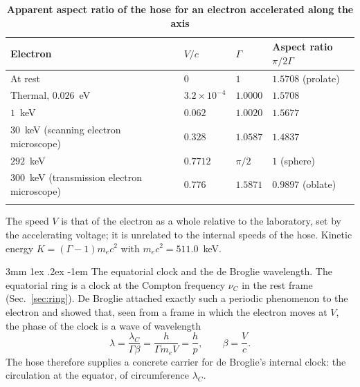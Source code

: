 \documentclass[%
 reprint, amsmath,amssymb, aps, prb, ]{revtex4-2}
\makeatletter
\numberwithin{equation}{section}
\renewcommand\paragraph{%
  \@startsection{paragraph}{4}{\z@}%
    {3mm \@plus 1ex \@minus .2ex}%
    {-1em}%
    {\normalfont\normalsize\itshape}}
\newcommand{\lamC}{\lambda_C}
\makeatother
\begin{document}
\begin{table}[t!]
\centering
\caption{\textbf{Apparent aspect ratio of the hose for an electron accelerated along the axis}}
\label{tab:boost}
\renewcommand{\arraystretch}{1.4}
\begin{tabular}{p{6.6cm}p{2.6cm}p{2.6cm}p{3.7cm}}
\toprule
\textbf{Electron} & \textbf{$V/c$} & \textbf{$\Gamma$} & \textbf{Aspect ratio $\pi/2\Gamma$} \\
\midrule
At rest & $0$ & $1$ & $1.5708$ (prolate) \\
\addlinespace[0.3cm]
Thermal, $0.026$~eV & $3.2\times10^{-4}$ & $1.0000$ & $1.5708$ \\
\addlinespace[0.3cm]
$1$~keV & $0.062$ & $1.0020$ & $1.5677$ \\
\addlinespace[0.3cm]
$30$~keV (scanning electron microscope) & $0.328$ & $1.0587$ & $1.4837$ \\
\addlinespace[0.3cm]
$292$~keV & $0.7712$ & $\pi/2$ & $1$ (sphere) \\
\addlinespace[0.3cm]
$300$~keV (transmission electron microscope) & $0.776$ & $1.5871$ & $0.9897$ (oblate) \\
\addlinespace[0.2cm]
\bottomrule
\end{tabular}
\vspace{0.2cm}
\begin{minipage}{0.95\textwidth}
\justifying\footnotesize
The speed $V$ is that of the electron as a whole relative to the laboratory, set by the accelerating voltage; it is unrelated to the internal speeds of the hose. Kinetic energy $K = (\Gamma - 1)m_ec^2$ with $m_ec^2 = 511.0$~keV.
\end{minipage}
\end{table}

\paragraph{The equatorial clock and the de Broglie wavelength.} The equatorial ring is a clock at the Compton frequency $\nu_C$ in the rest frame (Sec.~\ref{sec:ring}). De Broglie attached exactly such a periodic phenomenon to the electron and showed that, seen from a frame in which the electron moves at $V$, the phase of the clock is a wave of wavelength~\cite{deBroglie1925}
\begin{equation}
\lambda = \frac{\lamC}{\Gamma\beta} = \frac{h}{\Gamma m_e V} = \frac{h}{p}, \qquad \beta = \frac{V}{c} .
\label{eq:dB}
\end{equation}
The hose therefore supplies a concrete carrier for de Broglie's internal clock: the circulation at the equator, of circumference $\lamC$.
\end{document}

